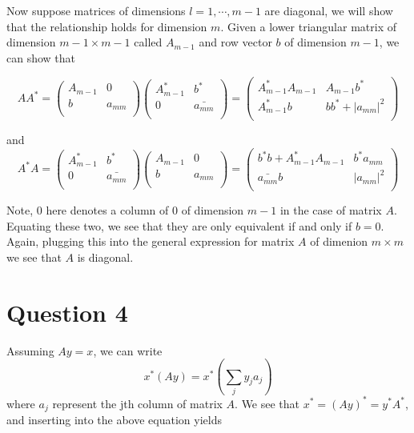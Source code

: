 \documentclass[a4paper,12pt]{article}
\begin{document}
 Now suppose matrices of dimensions $l=1,\cdots,m-1$ are diagonal, we will show that the relationship holds for dimension $m$. Given a lower triangular matrix of dimension $m-1 \times m-1$ called $A_{m-1}$ and row vector $b$ of dimension $m-1$, we can show that
 
 \begin{equation}
 AA^*=\begin{pmatrix}
A_{m-1} & 0 \\
b & a_{mm} \\
\end{pmatrix}
\begin{pmatrix}
A_{m-1}^* &b^* \\
0 & \bar{a_{mm}} \\
\end{pmatrix} =
\begin{pmatrix}
  A_{m-1}^*A_{m-1}   & A_{m-1}b^*  \\
  A_{m-1}^* b  & bb^* + | a_{mm} |^2 \\
\end{pmatrix}
 \end{equation}
 
 and 
 \begin{equation}
 A^*A=\begin{pmatrix}
A_{m-1}^* &b^* \\
0 & \bar{a_{mm}} \\
\end{pmatrix}
\begin{pmatrix}
A_{m-1} & 0 \\
b & a_{mm} \\
\end{pmatrix}
 =
\begin{pmatrix}
b^*b+ A_{m-1}^*A_{m-1} & b^* a_{mm}\\
\bar{a_{mm}} b & |a_{mm}|^2 \\
\end{pmatrix}
 \end{equation}

Note, $0$ here denotes a column of $0$ of dimension $m-1$ in the case of matrix $A$. Equating these two, we see that they are only equivalent if and only if $b = 0$. Again, plugging this into the general expression for matrix $A$ of dimenion $m\times m$ we see that $A$ is diagonal. 





\section{Question 4}
Assuming $Ay=x$, we can write
\begin{equation}
x^*(Ay)=x^*(\sum_j y_j a_j)
\end{equation} where $a_j$ represent the jth column of matrix $A$. We see that $x^{*} = (Ay)^{*}=y^{*} A^{*}$, and inserting into the above equation yields
\end{document}
